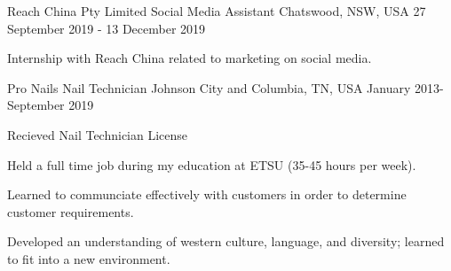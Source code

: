 

\begin{cventries}

  \cventry
    {Reach China Pty Limited} %
    {Social Media Assistant} %
    {Chatswood, NSW, USA} %
    {27 September 2019 - 13 December 2019} %
    {
      \begin{cvitems} %
      \item Internship with Reach China related to marketing on social media.
      \end{cvitems}
    }

  \cventry
    {Pro Nails} %
    {Nail Technician} %
    {Johnson City and Columbia, TN, USA} %
    {January 2013-September 2019} %
    {
      \begin{cvitems} %
      \item Recieved Nail Technician License
      \item Held a full time job during my education at ETSU (35-45 hours per week).
      \item Learned to communciate effectively with customers in order to determine customer requirements.
      \item Developed an understanding of western culture, language, and diversity; learned to fit into a new environment.
      \end{cvitems}
    }
\end{cventries}
